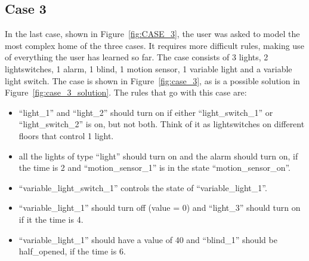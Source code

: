\documentclass[11pt,a4paper]{report}
\begin{document}
\subsection{Case 3}
In the last case, shown in Figure~\ref{fig:CASE_3}, the user was asked to model the most complex home of the three cases. It requires more difficult rules, making use of everything the user has learned so far. The case consists of 3 lights, 2 lightswitches, 1 alarm, 1 blind, 1 motion sensor, 1 variable light and a variable light switch. The case is shown in Figure~\ref{fig:case_3}, as is a possible solution in Figure~\ref{fig:case_3_solution}. The rules that go with this case are:
\begin{itemize}
    \item ``light\_1''  and ``light\_2'' should turn on if either ``light\_switch\_1'' or ``light\_switch\_2'' is on, but not both. Think of it as lightswitches on different floors that control 1 light.
    \item all the lights of type ``light'' should turn on and the alarm should turn on, if the time is 2 and ``motion\_sensor\_1'' is in the state ``motion\_sensor\_on''.
    \item ``variable\_light\_switch\_1'' controls the state of ``variable\_light\_1''.
    \item ``variable\_light\_1'' should turn off (value = 0) and ``light\_3'' should turn on if it the time is 4.
    \item ``variable\_light\_1'' should have a value of 40 and ``blind\_1'' should be half\_opened, if the time is 6.
\end{itemize}
\end{document}
